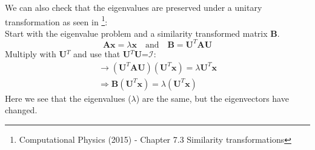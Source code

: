 \documentclass[12pt,a4paper,english]{article}
\begin{document}
We can also check that the eigenvalues are preserved under a unitary transformation as seen in \citet{lectures}\footnote{Computational Physics (2015) - Chapter 7.3 Similarity transformations}:\\
Start with the eigenvalue problem and a similarity transformed matrix \textbf{B}. 
\begin{equation}
\label{eq:sim_transf}
\textbf{Ax}=\lambda\textbf{x}\quad \text{and}\quad \textbf{B}=\textbf{U}^T\textbf{A}\textbf{U}
\end{equation}
Multiply with \textbf{U}$^T$ and use that \textbf{U}$^T$\textbf{U}=$\mathcal{I}$:
\begin{align*}
\rightarrow (\textbf{U}^T\textbf{A}\textbf{U})(\textbf{U}^T\textbf{x})=\lambda\textbf{U}^T\textbf{x}\\
\Rightarrow \textbf{B}(\textbf{U}^T\textbf{x})=\lambda(\textbf{U}^T\textbf{x})
\end{align*}
Here we see that the eigenvalues ($\lambda$) are the same, but the eigenvectors have changed.
\end{document}
